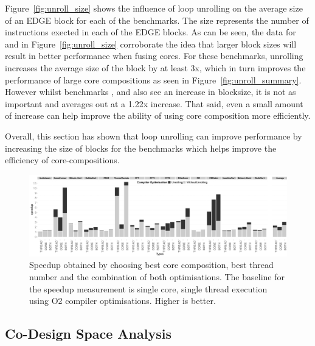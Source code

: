 Figure~\ref{fig:unroll_size} shows the influence of loop unrolling on the average size of an EDGE block for each of the benchmarks.
The size represents the number of instructions exected in each of the EDGE blocks.
As can be seen, the data for  and  in Figure~\ref{fig:unroll_size} corroborate the idea that larger block sizes will result in better performance when fusing cores.
For these benchmarks, unrolling increases the average size of the block by at least 3x, which in turn improves the performance of large core compositions as seen in Figure~\ref{fig:unroll_summary}.
However whilst benchmarks ,  and  also see an increase in blocksize, it is not as important and averages out at a 1.22x increase.
That said, even a small amount of increase can help improve the ability of using core composition more efficiently.

Overall, this section has shown that loop unrolling can improve performance by increasing the size of blocks for the benchmarks which helps improve the efficiency of core-compositions.

\begin{figure}[t]%
    \includegraphics[width=1\linewidth,keepaspectratio]{streamit-paper/graphics/threadcompbench.pdf}
    \caption{Speedup obtained by choosing best core composition, best
      thread number and the combination of both optimisations. The baseline for the speedup measurement is single core, single thread execution using O2 compiler optimisations. Higher
      is better.}\label{fig:overviewhist}
\end{figure}
\subsection{Co-Design Space Analysis}


